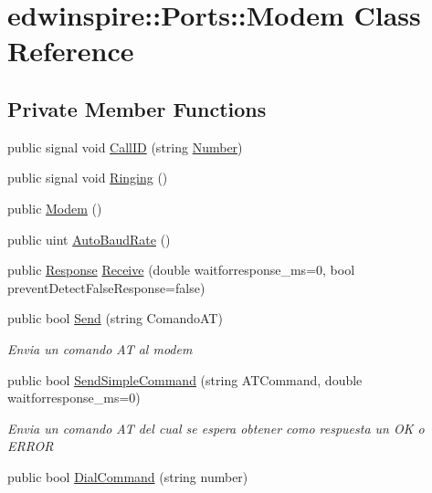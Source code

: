 \hypertarget{classedwinspire_1_1Ports_1_1Modem}{\section{edwinspire\-:\-:Ports\-:\-:Modem Class Reference}
\label{classedwinspire_1_1Ports_1_1Modem}
}
\subsection*{Private Member Functions}
\begin{DoxyCompactItemize}
\item 
public signal void \hyperlink{classedwinspire_1_1Ports_1_1Modem_a1d524eb74b5fed64ee9b06198c213b50}{Call\-I\-D} (string \hyperlink{namespaceedwinspire_1_1Ports_a45a12d9b3e1b045369ee6b3602c231f2}{Number})
\item 
public signal void \hyperlink{classedwinspire_1_1Ports_1_1Modem_a851b8c65f1804a8ca8bfeb938317fdf2}{Ringing} ()
\item 
public \hyperlink{classedwinspire_1_1Ports_1_1Modem_abc09ae65bf8bf909e3e036ef28ec8663}{Modem} ()
\item 
public uint \hyperlink{classedwinspire_1_1Ports_1_1Modem_a7f222f66c95efa13ce536eee965ee933}{Auto\-Baud\-Rate} ()
\item 
public \hyperlink{namespaceedwinspire_1_1Ports_afc37e1ee0b1084b5c5fccf2fab440b4f}{Response} \hyperlink{classedwinspire_1_1Ports_1_1Modem_a2e0d09bff4e330442fd22f04ece4fb86}{Receive} (double waitforresponse\-\_\-ms=0, bool prevent\-Detect\-False\-Response=false)
\item 
public bool \hyperlink{classedwinspire_1_1Ports_1_1Modem_a3cf23293b5727c0de41c7c9ec47a93ec}{Send} (string Comando\-A\-T)
\begin{DoxyCompactList}\small\item\em Envia un comando A\-T al modem \end{DoxyCompactList}\item 
public bool \hyperlink{classedwinspire_1_1Ports_1_1Modem_a8ab387ceecbf6bb952bb00579bb1c899}{Send\-Simple\-Command} (string A\-T\-Command, double waitforresponse\-\_\-ms=0)
\begin{DoxyCompactList}\small\item\em Envia un comando A\-T del cual se espera obtener como respuesta un O\-K o E\-R\-R\-O\-R \end{DoxyCompactList}\item 
public bool \hyperlink{classedwinspire_1_1Ports_1_1Modem_a3ca6e311188caba0e7bc11ee9536b9fc}{Dial\-Command} (string number)

\end{DoxyCompactItemize}
